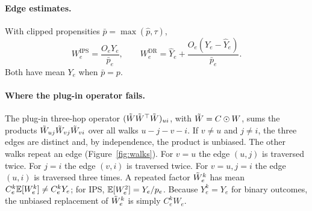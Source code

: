 \paragraph{Edge estimates.}
With clipped propensities $\bar p=\max(\hat p,\tau)$,
\begin{equation}
W^{\mathrm{IPS}}_e=\frac{O_eY_e}{\bar p_e},\qquad
W^{\mathrm{DR}}_e=\hat Y_e+\frac{O_e(Y_e-\hat Y_e)}{\bar p_e}.
\end{equation}
Both have mean $Y_e$ when $\bar p=p$.

\paragraph{Where the plug-in operator fails.}
The plug-in three-hop operator $(\tilde W\tilde W^\top\tilde W)_{ui}$, with $\tilde W=C\odot W$, sums
the products $\tilde W_{uj}\tilde W_{vj}\tilde W_{vi}$ over all walks $u\!-\!j\!-\!v\!-\!i$.
If $v\neq u$ and $j\neq i$, the three edges are distinct and, by independence,
the product is unbiased. The other walks repeat an edge
(Figure~\ref{fig:walks}). For $v=u$ the edge $(u,j)$ is traversed twice. For
$j=i$ the edge $(v,i)$ is traversed twice. For $v=u,j=i$ the edge $(u,i)$ is
traversed three times. A
repeated factor $\tilde W_e^k$ has mean $C_e^k\mathbb{E}[W_e^k]\ne C_e^kY_e$; for IPS,
$\mathbb{E}[W_e^2]=Y_e/p_e$. Because $Y_e^k=Y_e$ for binary outcomes, the unbiased
replacement of $\tilde W_e^k$ is simply $C_e^kW_e$.


